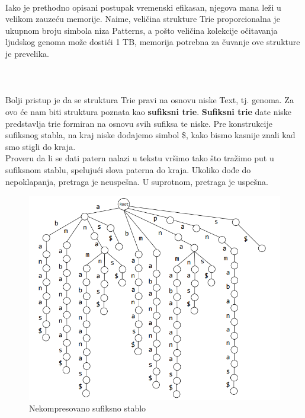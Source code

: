\\
Iako je prethodno opisani postupak vremenski efikasan, njegova mana leži u velikom zauzeću memorije. Naime, veličina strukture Trie proporcionalna je  ukupnom broju simbola niza Patterns, a pošto veličina kolekcije očitavanja ljudskog genoma može dostići 1 TB, memorija potrebna za čuvanje ove strukture je prevelika.
\\\\\\\\
Bolji pristup je da se struktura Trie pravi na osnovu niske Text, tj. genoma. Za ovo će nam biti struktura poznata kao \textbf{sufiksni trie}. \textbf{Sufiksni trie} date niske predstavlja trie formiran na osnovu svih sufiksa te niske. Pre konstrukcije sufiksnog stabla, na kraj niske dodajemo simbol \$, kako bismo kasnije znali kad smo stigli do kraja.
\\
Proveru da li se dati patern nalazi u tekstu vršimo tako što tražimo put u sufiksnom stablu, spelujući slova paterna do kraja. Ukoliko dođe do nepoklapanja, pretraga je neuspešna. U suprotnom, pretraga je uspešna.
\begin{figure}[h!]
\centering
\includegraphics[scale=0.5]{poglavlja/9/slike/sufiksnoStabloNekompresovano.png}
\caption{Nekompresovano sufiksno stablo}
\label{slika:X}
\end{figure}


